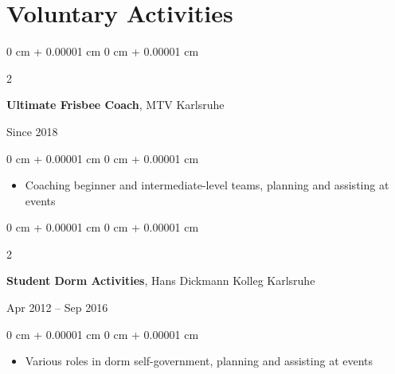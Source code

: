 \documentclass[10pt, letterpaper]{article}
\newenvironment{highlights}{
    \begin{itemize}[
        topsep=0.10 cm,
        parsep=0.10 cm,
        partopsep=0pt,
        itemsep=0pt,
        leftmargin=0 cm + 10pt
    ]
}{
    \end{itemize}
} %
\newenvironment{onecolentry}{
    \begin{adjustwidth}{
        0 cm + 0.00001 cm
    }{
        0 cm + 0.00001 cm
    }
}{
    \end{adjustwidth}
} %
\newenvironment{twocolentry}[2][]{
    \onecolentry
    \def\secondColumn{#2}
    \setcolumnwidth{\fill, 4.5 cm}
    \begin{paracol}{2}
}{
    \switchcolumn \raggedleft \secondColumn
    \end{paracol}
    \endonecolentry
} %
\begin{document}
        
        


    \sectionspace
    \section{Voluntary Activities}
    \sectspacetop
    \begin{twocolentry}{
            Since 2018
        }
            \textbf{Ultimate Frisbee Coach}, MTV Karlsruhe
           \end{twocolentry}
        \begin{onecolentry}
            \begin{highlights}
                \item Coaching beginner and intermediate-level teams, planning and assisting at events
            \end{highlights}
        \end{onecolentry}

        \expspace

        \begin{twocolentry}{
            Apr 2012 – Sep 2016
        }
            \textbf{Student Dorm Activities}, Hans Dickmann Kolleg Karlsruhe
            
            \end{twocolentry}
                  \begin{onecolentry}
            \begin{highlights}
                \item Various roles in dorm self-government, planning and assisting at events
            \end{highlights}
        \end{onecolentry}
    

    \sectionspace
\end{document}
